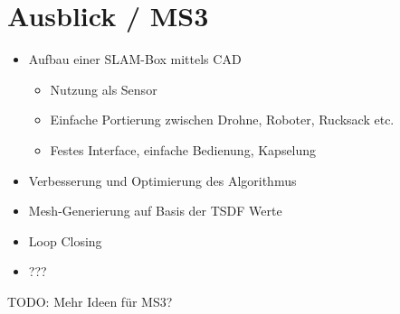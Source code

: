 \documentclass{beamer}
\begin{document}
\section{Ausblick / MS3}
\begin{frame}{\secname}
\begin{itemize}
\item{Aufbau einer SLAM-Box mittels CAD}
\begin{itemize}
\item{Nutzung als Sensor}
\item{Einfache Portierung zwischen Drohne, Roboter, Rucksack etc.}
\item{Festes Interface, einfache Bedienung, Kapselung}
\end{itemize}
\item{Verbesserung und Optimierung des Algorithmus}
\item{Mesh-Generierung auf Basis der TSDF Werte}
\item{Loop Closing}
\item{???}
\end{itemize}
TODO: Mehr Ideen für MS3?
\end{frame}
\end{document}
